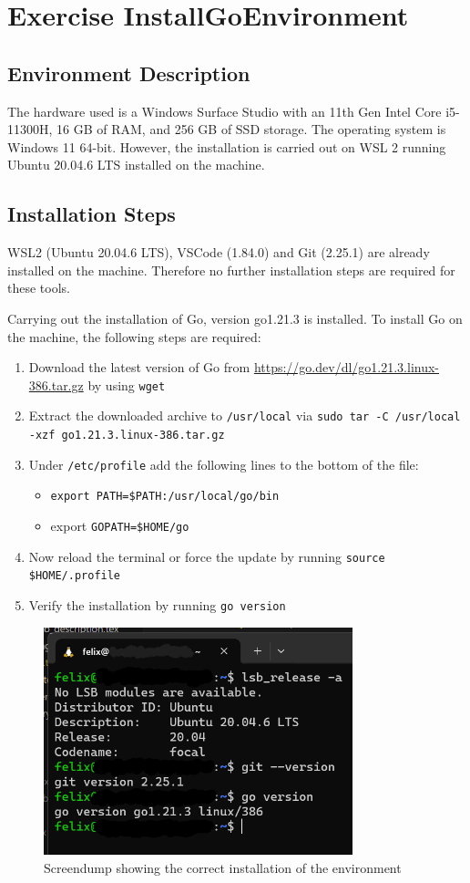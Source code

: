 \label{sec:exercise_install_go_env}

\section{Exercise InstallGoEnvironment}

\subsection*{Environment Description}
The hardware used is a Windows Surface Studio with an 11th Gen Intel Core i5-11300H, 16 GB of RAM, and 256 GB of SSD storage.
The operating system is Windows 11 64-bit. However, the installation is carried out on WSL 2 running Ubuntu 20.04.6 LTS installed on the machine.

\subsection*{Installation Steps}
WSL2 (Ubuntu 20.04.6 LTS), VSCode (1.84.0) and Git (2.25.1) are already installed on the machine. Therefore no further installation steps are required for these tools.

Carrying out the installation of Go, version go1.21.3 is installed.
To install Go on the machine, the following steps are required:
\begin{enumerate}
    \item Download the latest version of Go from \url{https://go.dev/dl/go1.21.3.linux-386.tar.gz} by using  \texttt{wget}
    \item Extract the downloaded archive to \texttt{/usr/local} via \texttt{sudo tar -C /usr/local -xzf go1.21.3.linux-386.tar.gz}
    \item Under \texttt{/etc/profile} add the following lines to the bottom of the file: 
    \begin{itemize}
        \item \texttt{export PATH=\$PATH:/usr/local/go/bin}
        \item export \texttt{GOPATH=\$HOME/go}
    \end{itemize}
    \item Now reload the terminal or force the update by running \texttt{source \$HOME/.profile}
    \item Verify the installation by running \texttt{go version}
\end{enumerate}

\begin{figure}
	\centering
	\includegraphics[width=0.8\textwidth]{figures/goLang/installation_screendump.png}
	\caption{Screendump showing the correct installation of the environment}
	\label{fig:screendump_installation}
\end{figure}